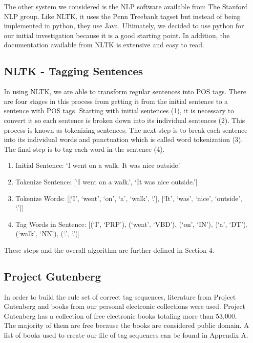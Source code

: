 \documentclass[11pt,a4paper]{article}
\begin{document}
\begin{multicols}{2}
The other system we considered is the NLP software available from The Stanford NLP group. Like NLTK, it uses the Penn Treebank tagset but instead of being implemented in python, they use Java. Ultimately, we decided to use python for our initial investigation because it is a good starting point. In addition, the documentation available from NLTK is extensive and easy to read.

\subsection{NLTK - Tagging Sentences}
In using NLTK, we are able to transform regular sentences into POS tags. There are four stages in this process from getting it from the initial sentence to a sentence with POS tags. Starting with initial sentences (1), it is necessary to convert it so each sentence is broken down into its individual sentences (2). This process is known as tokenizing sentences. The next step is to break each sentence into its individual words and punctuation which is called word tokenization (3). The final step is to tag each word in the sentence (4).

\begin{enumerate}
   \item Initial Sentence: `I went on a walk. It was nice outside.'
   \item Tokenize Sentence: [`I went on a walk.', `It was nice outside.']
   \item Tokenize Words: [[`I', `went', `on', `a', `walk', `.'], [`It', `was', `nice', `outside', `.']]
   \item Tag Words in Sentence: [(`I', `PRP'), (`went', `VBD'), (`on', `IN'), (`a', `DT'), (`walk', `NN'), (`.', `.')]
\end{enumerate}

These steps and the overall algorithm are further defined in Section 4.

\subsection{Project Gutenberg}
In order to build the rule set of correct tag sequences, literature from Project Gutenberg \cite{gutenberg} and books from our personal electronic collections were used. Project Gutenberg has a collection of free electronic books totaling more than 53,000. The majority of them are free because the books are considered public domain. A list of books used to create our file of tag sequences can be found in Appendix A. 


\end{multicols}
\end{document}
